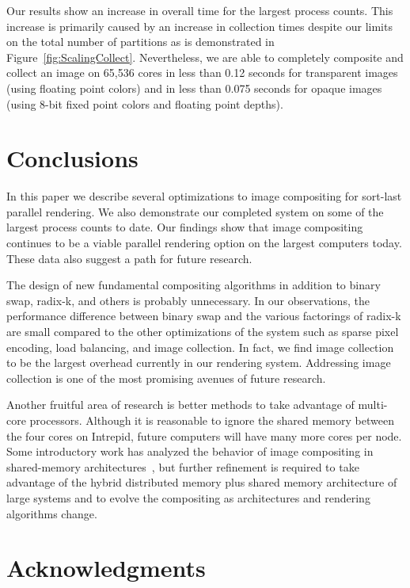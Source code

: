 \documentclass{acm_proc_article-sp}
\newcommand*{\lcite}[1]{~\cite{#1}}
\begin{document}
Our results show an increase in overall time for the largest process
counts.  This increase is primarily caused by an increase in collection
times despite our limits on the total number of partitions as is
demonstrated in Figure~\ref{fig:ScalingCollect}.  Nevertheless, we are able
to completely composite and collect an image on 65,536 cores in less than
0.12 seconds for transparent images (using floating point colors) and in
less than 0.075 seconds for opaque images (using 8-bit fixed point colors
and floating point depths).

\section{Conclusions}
\label{sec:Conclusions}

In this paper we describe several optimizations to image compositing for
sort-last parallel rendering.  We also demonstrate our completed system on
some of the largest process counts to date.  Our findings show that image
compositing continues to be a viable parallel rendering option on the
largest computers today.  These data also suggest a path for future
research.

The design of new fundamental compositing algorithms in addition to binary
swap, radix-k, and others is probably unnecessary.  In our observations,
the performance difference between binary swap and the various factorings
of radix-k are small compared to the other optimizations of the system such
as sparse pixel encoding, load balancing, and image collection.  In fact,
we find image collection to be the largest overhead currently in our
rendering system.  Addressing image collection is one of the most promising
avenues of future research.

Another fruitful area of research is better methods to take advantage of
multi-core processors.  Although it is reasonable to ignore the shared
memory between the four cores on Intrepid, future computers will have many
more cores per node.  Some introductory work has analyzed the behavior of
image compositing in shared-memory
architectures\lcite{Nouanesengsy2011,Reinhard2000}, but further refinement
is required to take advantage of the hybrid distributed memory plus shared
memory architecture of large systems and to evolve the compositing as
architectures and rendering algorithms change.

\section{Acknowledgments}
\end{document}
